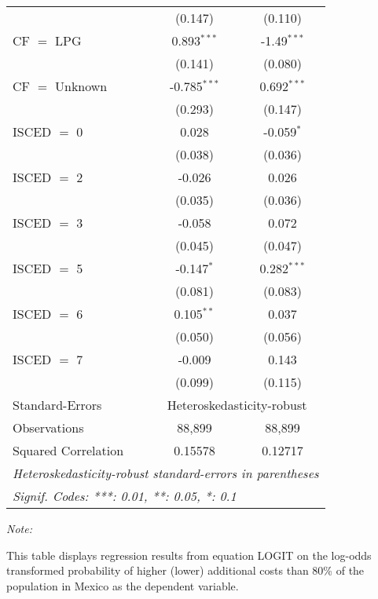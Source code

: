 \begin{table}[htbp!]
\begin{adjustbox}{width = 1\textwidth, max height = 0.95\textheight, center}
\begin{threeparttable}[b]
\begin{tabular}{lcc}
                                 & (0.147)        & (0.110)\\   
            CF $=$ LPG           & 0.893$^{***}$  & -1.49$^{***}$\\   
                                 & (0.141)        & (0.080)\\   
            CF $=$ Unknown       & -0.785$^{***}$ & 0.692$^{***}$\\   
                                 & (0.293)        & (0.147)\\   
            ISCED $=$ 0          & 0.028          & -0.059$^{*}$\\   
                                 & (0.038)        & (0.036)\\   
            ISCED $=$ 2          & -0.026         & 0.026\\   
                                 & (0.035)        & (0.036)\\   
            ISCED $=$ 3          & -0.058         & 0.072\\   
                                 & (0.045)        & (0.047)\\   
            ISCED $=$ 5          & -0.147$^{*}$   & 0.282$^{***}$\\   
                                 & (0.081)        & (0.083)\\   
            ISCED $=$ 6          & 0.105$^{**}$   & 0.037\\   
                                 & (0.050)        & (0.056)\\   
            ISCED $=$ 7          & -0.009         & 0.143\\   
                                 & (0.099)        & (0.115)\\   
            \midrule 
            Standard-Errors & \multicolumn{2}{c}{Heteroskedasticity-robust} \\ 
            Observations         & 88,899         & 88,899\\  
            Squared Correlation  & 0.15578        & 0.12717\\  
            \midrule \midrule
            \multicolumn{3}{l}{\emph{Heteroskedasticity-robust standard-errors in parentheses}}\\
            \multicolumn{3}{l}{\emph{Signif. Codes: ***: 0.01, **: 0.05, *: 0.1}}\\
         \end{tabular}
         
         \begin{tablenotes}\item \medskip \textit{Note:}
            \item This table displays regression results from equation LOGIT on the log-odds transformed probability of higher (lower) additional costs than 80\% of the population in Mexico as the dependent variable. 
         \end{tablenotes}
      \end{threeparttable}
   \end{adjustbox}
\end{table}


